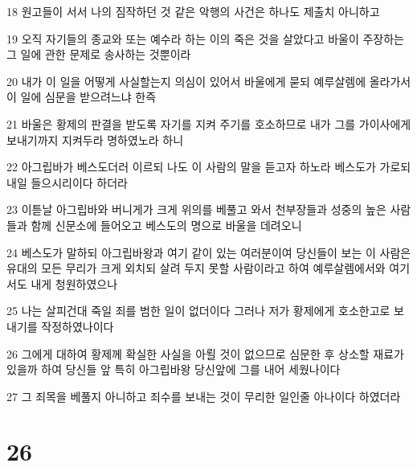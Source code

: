 \par 18 원고들이 서서 나의 짐작하던 것 같은 악행의 사건은 하나도 제출치 아니하고
\par 19 오직 자기들의 종교와 또는 예수라 하는 이의 죽은 것을 살았다고 바울이 주장하는 그 일에 관한 문제로 송사하는 것뿐이라
\par 20 내가 이 일을 어떻게 사실할는지 의심이 있어서 바울에게 묻되 예루살렘에 올라가서 이 일에 심문을 받으려느냐 한즉
\par 21 바울은 황제의 판결을 받도록 자기를 지켜 주기를 호소하므로 내가 그를 가이사에게 보내기까지 지켜두라 명하였노라 하니
\par 22 아그립바가 베스도더러 이르되 나도 이 사람의 말을 듣고자 하노라 베스도가 가로되 내일 들으시리이다 하더라
\par 23 이튿날 아그립바와 버니게가 크게 위의를 베풀고 와서 천부장들과 성중의 높은 사람들과 함께 신문소에 들어오고 베스도의 명으로 바울을 데려오니
\par 24 베스도가 말하되 아그립바왕과 여기 같이 있는 여러분이여 당신들이 보는 이 사람은 유대의 모든 무리가 크게 외치되 살려 두지 못할 사람이라고 하여 예루살렘에서와 여기서도 내게 청원하였으나
\par 25 나는 살피건대 죽일 죄를 범한 일이 없더이다 그러나 저가 황제에게 호소한고로 보내기를 작정하였나이다
\par 26 그에게 대하여 황제께 확실한 사실을 아뢸 것이 없으므로 심문한 후 상소할 재료가 있을까 하여 당신들 앞 특히 아그립바왕 당신앞에 그를 내어 세웠나이다
\par 27 그 죄목을 베풀지 아니하고 죄수를 보내는 것이 무리한 일인줄 아나이다 하였더라

\chapter{26}

